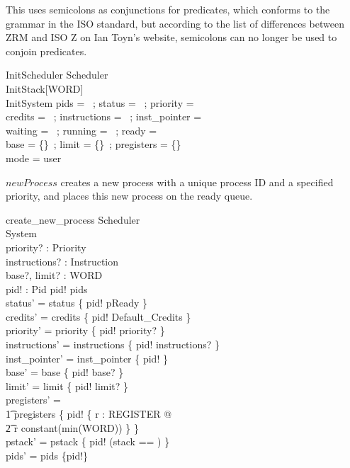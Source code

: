 \documentclass{article}
\begin{document}
This uses semicolons as conjunctions for predicates, which conforms to
the grammar in the ISO standard, but according to the list of
differences between ZRM and ISO Z on Ian Toyn's website, semicolons
can no longer be used to conjoin predicates.

\begin{schema}{InitScheduler}
    Scheduler\\
    InitStack[WORD]\\
    InitSystem
\where
    pids = \emptyset~; status = \emptyset~; priority = \emptyset\\
    credits = \emptyset~; instructions = \emptyset~; inst\_pointer = \emptyset\\
    waiting = \emptyset~; running = \emptyset~; ready = \langle \rangle\\
    base = \{\}~; limit = \{\}~; pregisters = \{\}\\
    mode = user
\end{schema}

$newProcess$ creates a new process with a unique process ID and a
specified priority, and places this new process on the ready queue.

\begin{schema}{create\_new\_process}
  \Delta Scheduler\\
  \Xi System\\
  priority? : Priority\\
  instructions? : \seq Instruction\\
  base?, limit? : WORD\\
  pid! : Pid
\where
  pid! \notin pids\\
  status' = status \cup \{ pid! \mapsto pReady \}\\
  credits' = credits \cup \{ pid! \mapsto Default\_Credits \}\\
  priority' = priority \cup \{ pid! \mapsto priority? \}\\
  instructions' = instructions \cup \{ pid! \mapsto instructions? \}\\
  inst\_pointer' = inst\_pointer \cup \{ pid!  \}\\
  base' = base \cup \{ pid! \mapsto base? \}\\
  limit' = limit \cup \{ pid! \mapsto limit? \}\\
  pregisters' =\\
    \t1 pregisters \cup \{ pid! \mapsto \{ r : REGISTER @ \\
      \t2 r \mapsto constant(min(WORD)) \} \}\\
  pstack' =
    pstack \cup \{ pid! \mapsto (\lblot stack == \langle \rangle \rblot) \}\\
    pids' = pids \cup \{pid!\}
\end{schema}
\end{document}
